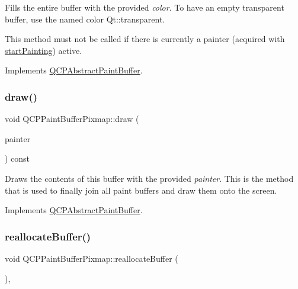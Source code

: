 Fills the entire buffer with the provided {\itshape color}. To have an empty transparent buffer, use the named color {\ttfamily Qt\+::transparent}.

This method must not be called if there is currently a painter (acquired with \hyperlink{classQCPPaintBufferPixmap_a357964ef7d28cfa530338be4e5c93234}{start\+Painting}) active. 

Implements \hyperlink{classQCPAbstractPaintBuffer_a9e253f4541dfc01992b77e8830bd7722}{Q\+C\+P\+Abstract\+Paint\+Buffer}.

\mbox{\label{classQCPPaintBufferPixmap_af7bfc685e56a0a9329e57cd9a265eb74}} 
\subsubsection{\texorpdfstring{draw()}{draw()}}
{\footnotesize\ttfamily void Q\+C\+P\+Paint\+Buffer\+Pixmap\+::draw (\begin{DoxyParamCaption}\item[{\hyperlink{classQCPPainter}{Q\+C\+P\+Painter} $\ast$}]{painter }\end{DoxyParamCaption}) const\hspace{0.3cm}{\ttfamily [virtual]}}

Draws the contents of this buffer with the provided {\itshape painter}. This is the method that is used to finally join all paint buffers and draw them onto the screen. 

Implements \hyperlink{classQCPAbstractPaintBuffer_afb998c7525e3ae37d9d2d46c7aaf461a}{Q\+C\+P\+Abstract\+Paint\+Buffer}.

\mbox{\label{classQCPPaintBufferPixmap_ad49f3205ba3463b1c44f8db3cfcc90f0}} 
\subsubsection{\texorpdfstring{reallocate\+Buffer()}{reallocateBuffer()}}
{\footnotesize\ttfamily void Q\+C\+P\+Paint\+Buffer\+Pixmap\+::reallocate\+Buffer (\begin{DoxyParamCaption}{ }\end{DoxyParamCaption})\hspace{0.3cm}{\ttfamily [protected]}, {\ttfamily [virtual]}}

